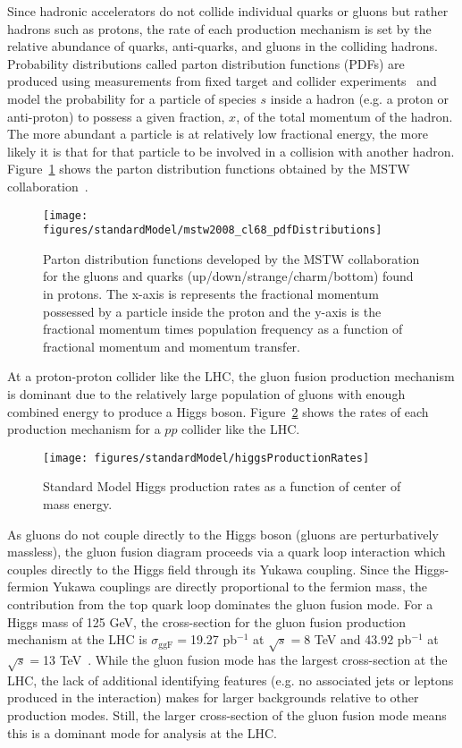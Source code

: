 Since hadronic accelerators do not collide individual quarks or gluons but rather hadrons such as protons, the rate of each production mechanism is set by the relative abundance of quarks, anti-quarks, and gluons in the colliding hadrons. Probability distributions called parton distribution functions (PDFs) are produced using measurements from fixed target and collider experiments~\cite{mstw1, mstw2, Lai:2010vv, ct102, nnpdf, ref:pdf4lhc} and model the probability for a particle of species $s$ inside a hadron (e.g. a proton or anti-proton) to possess a given fraction, $x$, of the total momentum of the hadron. The more abundant a particle is at relatively low fractional energy, the more likely it is that for that particle to be involved in a collision with another hadron. Figure~\ref{fig:mstwPDF} shows the parton distribution functions obtained by the MSTW collaboration~\cite{mstw1}. 
\begin{figure}[h!]
\centering
\texttt{[image: figures/standardModel/mstw2008\_cl68\_pdfDistributions]}
\caption{Parton distribution functions developed by the MSTW collaboration for the gluons and quarks (up/down/strange/charm/bottom) found in protons. The x-axis is represents the fractional momentum possessed by a particle inside the proton and the y-axis is the fractional momentum times population frequency as a function of fractional momentum and momentum transfer.}
\label{fig:mstwPDF}
\end{figure}
At a proton-proton collider like the LHC, the gluon fusion production mechanism is dominant due to the relatively large population of gluons with enough combined energy to produce a Higgs boson. Figure~\ref{fig:higgsProductionRates} shows the rates of each production mechanism for a $pp$ collider like the LHC.

\begin{figure}[h!]
\centering
\texttt{[image: figures/standardModel/higgsProductionRates]}
\caption{Standard Model Higgs production rates as a function of center of mass energy.}
\label{fig:higgsProductionRates}
\end{figure}

As gluons do not couple directly to the Higgs boson (gluons are perturbatively massless), the gluon fusion diagram proceeds via a quark loop interaction which couples directly to the Higgs field through its Yukawa coupling. Since the Higgs-fermion Yukawa couplings are directly proportional to the fermion mass, the contribution from the top quark loop dominates the gluon fusion mode. For a Higgs mass of 125 GeV, the cross-section for the gluon fusion production mechanism at the LHC is $\sigma_{\text{ggF}} = $19.27 pb$^{-1}$ at $\sqrt{s} = $8 TeV and 43.92 pb$^{-1}$ at $\sqrt{s} = $13 TeV~\cite{Heinemeyer:2013tqa}. While the gluon fusion mode has the largest cross-section at the LHC, the lack of additional identifying features (e.g. no associated jets or leptons produced in the interaction) makes for larger backgrounds relative to other production modes. Still, the larger cross-section of the gluon fusion mode means this is a dominant mode for analysis at the LHC.

